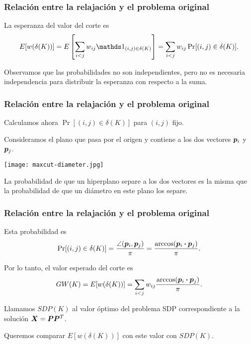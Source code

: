 \documentclass[aspectratio=169,12pt,spanish]{beamer}
\begin{document}

\begin{frame}
\frametitle{Relación entre la relajación y el problema original}

La esperanza del valor del corte es
$$
E[w(\delta(K))] = E\left[\sum_{i  < j} w_{ij} \one_{(i,j) \in \delta(K)}\right] = \sum_{i < j} w_{ij} \Pr[(i,j) \in \delta(K)].
$$

Observamos que las probabilidades no son independientes, pero no es necesaria independencia para distribuir la esperanza con respecto a la suma.

\end{frame}


\begin{frame}
\frametitle{Relación entre la relajación y el problema original}

Calculamos ahora $\Pr[(i,j) \in \delta(K)]$ para $(i,j)$ fijo.

Consideramos el plano que pasa por el origen y contiene a los dos vectores $\bm{p}_i$ y $\bm{p}_j$.
\begin{center}
\texttt{[image: maxcut-diameter.jpg]}
\end{center}


La probabilidad de que un hiperplano separe a los dos vectores es la misma que la probabilidad de que un diámetro en este plano los separe.


\end{frame}


\begin{frame}
\frametitle{Relación entre la relajación y el problema original}

Esta probabilidad es
$$
\Pr[(i,j) \in \delta(K)] = \frac{\angle(\bm{p}_i, \bm{p}_j)}{\pi} = \frac{\arccos(\bm{p}_i \boldsymbol{\cdot} \bm{p}_j)}{\pi}.
$$


Por lo tanto, el valor esperado del corte es
$$
GW(K) = E[w(\delta(K))] = \sum_{i<j} w_{ij} \frac{\arccos(\bm{p}_i \boldsymbol{\cdot} \bm{p}_j)}{\pi}.
$$


Llamamos $SDP(K)$ al valor óptimo del problema SDP correspondiente a la solución $\bm{X} = \bm{P} \bm{P}^T$.

Queremos comparar $E[w(\delta(K))]$ con este valor con $SDP(K)$.


\end{frame}
\end{document}
